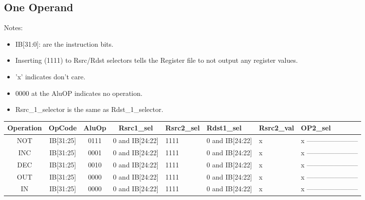 \documentclass[12pt]{report}
\begin{document}
\subsection{One Operand}
\item Notes:
    \begin{itemize}
        \item IB[31:0]: are the instruction bits.
        \item Inserting (1111) to Rsrc/Rdst selectors tells the Register file to not output any register values.
        \item 'x' indicates don't care.
        \item 0000 at the AluOP indicates no operation.
        \item Rsrc_1_selector is the same as Rdst_1_selector.
    \end{itemize}

    \begin{center}
    \begin{tabular}{||c| c| c| c| p{40mm}||} 
    \hline
    Operation & OpCode & AluOp & Rsrc1_sel & Rsrc2_sel & Rdst1_sel & Rsrc2_val & OP2_sel  \\ [0.5ex] 
    \hline\hline
    NOT & IB[31:25] & 0111 & 0 and IB[24:22] & 1111 & 0 and IB[24:22] & x & x ----------------------- \\
    \hline
    INC & IB[31:25] & 0001 & 0 and IB[24:22] & 1111 & 0 and IB[24:22] & x & x  ----------------------- \\
    \hline
    DEC & IB[31:25] & 0010 & 0 and IB[24:22] & 1111 & 0 and IB[24:22] & x & x ----------------------- \\
    \hline
    OUT & IB[31:25] & 0000 & 0 and IB[24:22] & 1111 & 0 and IB[24:22] & x & x ----------------------- \\
    \hline
    IN  & IB[31:25] & 0000 & 0 and IB[24:22] & 1111 & 0 and IB[24:22] & x & x ----------------------- \\
    \hline

    \end{tabular}
    \end{center}
\end{document}
